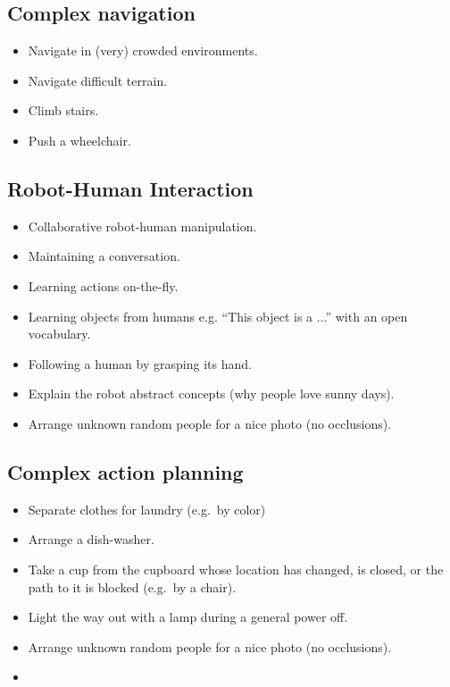 \subsection{Complex navigation}
\begin{itemize}
	\item Navigate in (very) crowded environments.
	\item Navigate difficult terrain.
	\item Climb stairs.
	\item Push a wheelchair.
\end{itemize}

\subsection{Robot-Human Interaction}
\begin{itemize}
	\item Collaborative robot-human manipulation.
	\item Maintaining a conversation.
	\item Learning actions on-the-fly.
	\item Learning objects from humans e.g. ``This object is a ...'' with an open vocabulary.
	\item Following a human by grasping its hand.
	\item Explain the robot abstract concepts (why people love sunny days).
	\item Arrange unknown random people for a nice photo (no occlusions).
\end{itemize}

\subsection{Complex action planning} 
\begin{itemize}
	\item Separate clothes for laundry (e.g.~by color)
	\item Arrange a dish-washer.
	\item Take a cup from the cupboard whose location has changed, is closed, or the path to it is blocked (e.g.~by a chair).
	\item Light the way out with a lamp during a general power off.
	\item Arrange unknown random people for a nice photo (no occlusions).
	\item 
\end{itemize}

